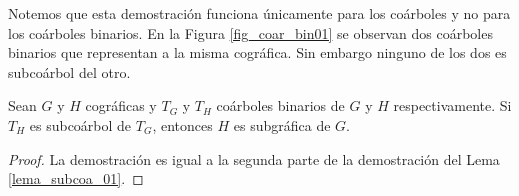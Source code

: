 Notemos que esta demostración funciona únicamente para los coárboles y no para los coárboles binarios. En la Figura \ref{fig_coar_bin01} se observan dos coárboles binarios que representan a la misma cográfica. Sin embargo ninguno de los dos es subcoárbol del otro.

\begin{lemma}
    Sean $G$ y $H$ cográficas y $T_G$ y $T_H$ coárboles binarios de $G$ y $H$ respectivamente. Si $T_H$ es subcoárbol de $T_G$, entonces $H$ es subgráfica de $G$.
\end{lemma}

\begin{proof}
    La demostración es igual a la segunda parte de la demostración del Lema \ref{lema_subcoa_01}.
\end{proof}
